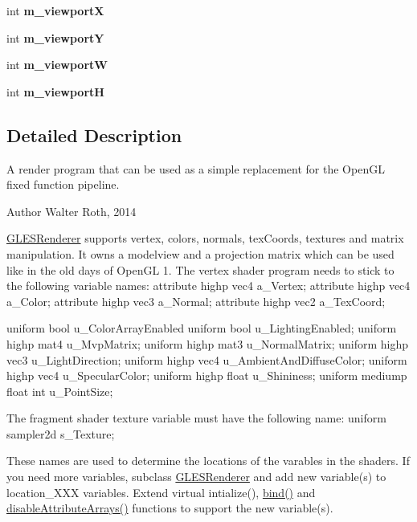 \begin{DoxyCompactItemize}
int {\bfseries m\+\_\+viewportX}
\item 
\mbox{\label{class_g_l_e_s_renderer_a0e81b88aa0c613e99dc6be1737d83c93}} 
int {\bfseries m\+\_\+viewportY}
\item 
\mbox{\label{class_g_l_e_s_renderer_af839e0f722a97a026d7517de19acd352}} 
int {\bfseries m\+\_\+viewportW}
\item 
\mbox{\label{class_g_l_e_s_renderer_a07da628f9769b11914946d71b71a4665}} 
int {\bfseries m\+\_\+viewportH}
\end{DoxyCompactItemize}


\subsection{Detailed Description}
A render program that can be used as a simple replacement for the Open\+GL fixed function pipeline. 

\begin{DoxyAuthor}{Author}
Walter Roth, 2014
\end{DoxyAuthor}
\mbox{\hyperlink{class_g_l_e_s_renderer}{G\+L\+E\+S\+Renderer}} supports vertex, colors, normals, tex\+Coords, textures and matrix manipulation. It owns a modelview and a projection matrix which can be used like in the old days of Open\+GL 1. The vertex shader program needs to stick to the following variable names\+: attribute highp vec4 a\+\_\+\+Vertex; attribute highp vec4 a\+\_\+\+Color; attribute highp vec3 a\+\_\+\+Normal; attribute highp vec2 a\+\_\+\+Tex\+Coord;

uniform bool u\+\_\+\+Color\+Array\+Enabled uniform bool u\+\_\+\+Lighting\+Enabled; uniform highp mat4 u\+\_\+\+Mvp\+Matrix; uniform highp mat3 u\+\_\+\+Normal\+Matrix; uniform highp vec3 u\+\_\+\+Light\+Direction; uniform highp vec4 u\+\_\+\+Ambient\+And\+Diffuse\+Color; uniform highp vec4 u\+\_\+\+Specular\+Color; uniform highp float u\+\_\+\+Shininess; uniform mediump float int u\+\_\+\+Point\+Size;

The fragment shader texture variable must have the following name\+: uniform sampler2d s\+\_\+\+Texture;

These names are used to determine the locations of the varables in the shaders. If you need more variables, subclass \mbox{\hyperlink{class_g_l_e_s_renderer}{G\+L\+E\+S\+Renderer}} and add new variable(s) to location\+\_\+\+X\+XX variables. Extend virtual intialize(), \mbox{\hyperlink{class_g_l_e_s_renderer_a41d040c7fa439552abf339b3883b02f4}{bind()}} and \mbox{\hyperlink{class_g_l_e_s_renderer_a0978cd1fe3baab589b7bfbcde6554c15}{disable\+Attribute\+Arrays()}} functions to support the new variable(s).

